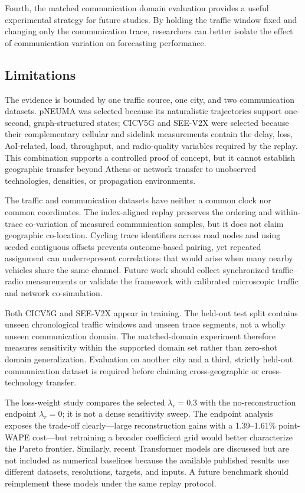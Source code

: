\documentclass[pdflatex,sn-mathphys-num]{sn-jnl}%
\newenvironment{changed}{}{}
\theoremstyle{thmstyleone}%
\theoremstyle{thmstyletwo}%
\theoremstyle{thmstylethree}%
\begin{document}
Fourth, the matched communication domain evaluation provides a useful experimental strategy for future studies. By holding the traffic window fixed and changing only the communication trace, researchers can better isolate the effect of communication variation on forecasting performance.

\subsection{Limitations}
\label{subsec:discussion_limitations}

\begin{changed}
The evidence is bounded by one traffic source, one city, and two communication datasets. pNEUMA was selected because its naturalistic trajectories support one-second, graph-structured states; CICV5G and SEE-V2X were selected because their complementary cellular and sidelink measurements contain the delay, loss, AoI-related, load, throughput, and radio-quality variables required by the replay. This combination supports a controlled proof of concept, but it cannot establish geographic transfer beyond Athens or network transfer to unobserved technologies, densities, or propagation environments.

The traffic and communication datasets have neither a common clock nor common coordinates. The index-aligned replay preserves the ordering and within-trace co-variation of measured communication samples, but it does not claim geographic co-location. Cycling trace identifiers across road nodes and using seeded contiguous offsets prevents outcome-based pairing, yet repeated assignment can underrepresent correlations that would arise when many nearby vehicles share the same channel. Future work should collect synchronized traffic--radio measurements or validate the framework with calibrated microscopic traffic and network co-simulation.

Both CICV5G and SEE-V2X appear in training. The held-out test split contains unseen chronological traffic windows and unseen trace segments, not a wholly unseen communication domain. The matched-domain experiment therefore measures sensitivity within the supported domain set rather than zero-shot domain generalization. Evaluation on another city and a third, strictly held-out communication dataset is required before claiming cross-geographic or cross-technology transfer.

The loss-weight study compares the selected \(\lambda_r=0.3\) with the no-reconstruction endpoint \(\lambda_r=0\); it is not a dense sensitivity sweep. The endpoint analysis exposes the trade-off clearly---large reconstruction gains with a 1.39--1.61\% point-WAPE cost---but retraining a broader coefficient grid would better characterize the Pareto frontier. Similarly, recent Transformer models are discussed but are not included as numerical baselines because the available published results use different datasets, resolutions, targets, and inputs. A future benchmark should reimplement these models under the same replay protocol.


\end{changed}
\end{document}
